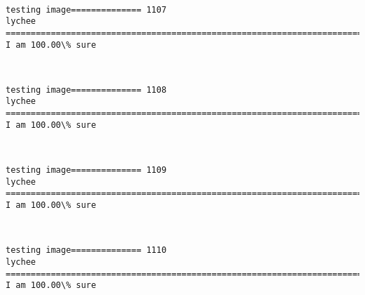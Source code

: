 \documentclass[11pt]{article}
\begin{document}
    \begin{center}
    \end{center}
    { \hspace*{\fill} \\}
    
    \begin{Verbatim}[commandchars=\\\{\}]
testing image============== 1107
lychee
============================================================================
I am 100.00\% sure

    \end{Verbatim}

    \begin{center}
    \end{center}
    { \hspace*{\fill} \\}
    
    \begin{Verbatim}[commandchars=\\\{\}]
testing image============== 1108
lychee
============================================================================
I am 100.00\% sure

    \end{Verbatim}

    \begin{center}
    \end{center}
    { \hspace*{\fill} \\}
    
    \begin{Verbatim}[commandchars=\\\{\}]
testing image============== 1109
lychee
============================================================================
I am 100.00\% sure

    \end{Verbatim}

    \begin{center}
    \end{center}
    { \hspace*{\fill} \\}
    
    \begin{Verbatim}[commandchars=\\\{\}]
testing image============== 1110
lychee
============================================================================
I am 100.00\% sure

    \end{Verbatim}
\end{document}
